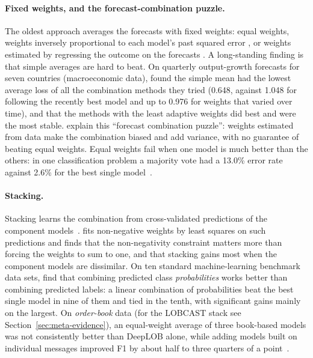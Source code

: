 \paragraph{Fixed weights, and the forecast-combination puzzle.} The oldest approach averages the forecasts
with fixed weights: equal weights, weights inversely proportional to each model's past squared error
\citep{bates1969}, or weights estimated by regressing the outcome on the forecasts \citep{granger1984}. A
long-standing finding is that simple averages are hard to beat. On quarterly output-growth forecasts for seven
countries (macroeconomic data), \citet{stockwatson2004} found the simple mean had the lowest average loss of all the combination
methods they tried (0.648, against 1.048 for following the recently best model and up to 0.976 for weights
that varied over time), and that the methods with the least adaptive weights did best and were the most
stable. \citet{claeskens2016} explain this ``forecast combination puzzle'': weights estimated from data make
the combination biased and add variance, with no guarantee of beating equal weights. Equal weights fail
when one model is much better than the others: in one classification problem a majority vote had a 13.0\%
error rate against 2.6\% for the best single model~\citep{ting1999}.

\paragraph{Stacking.} Stacking learns the combination from cross-validated predictions of the component
models~\citep{wolpert1992,breiman1996stack}. \citet{breiman1996stack} fits non-negative weights by least
squares on such predictions and finds that the non-negativity constraint matters more than forcing the
weights to sum to one, and that stacking gains most when the component models are dissimilar.
On ten standard machine-learning benchmark data sets, \citet{ting1999} find that combining predicted
class \emph{probabilities} works better than combining predicted labels: a linear combination of
probabilities beat the best single model in nine of them and tied in the tenth, with significant gains
mainly on the largest. On \emph{order-book} data (for the LOBCAST stack see Section~\ref{sec:meta-evidence}), an
equal-weight average of three book-based models was not consistently better than DeepLOB alone, while
adding models built on individual messages improved F1 by about half to three quarters of a point~\citep{zhanglimzohren2021mbo}.

